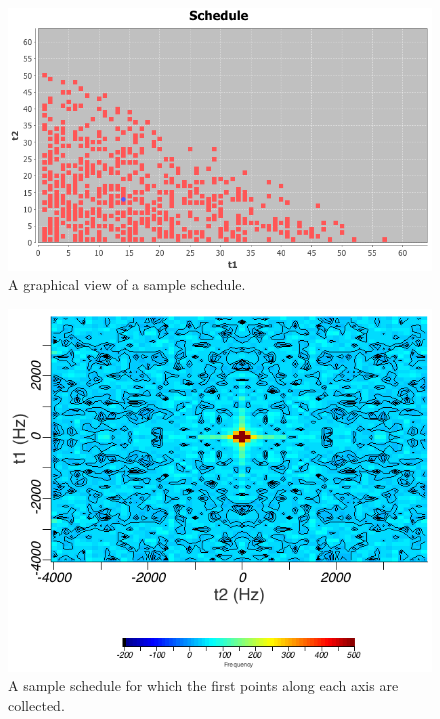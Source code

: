\begin{figure}
  \includegraphics[scale=0.5]{figures/sched1}
  \caption{A graphical view of a sample schedule.}
  \label{sched1}
\end{figure}

\begin{figure}
  \includegraphics[scale=0.5]{figures/fft1}
  \caption{A sample schedule for which the first points along
           each axis are collected.}
  \label{fft1}
\end{figure}

